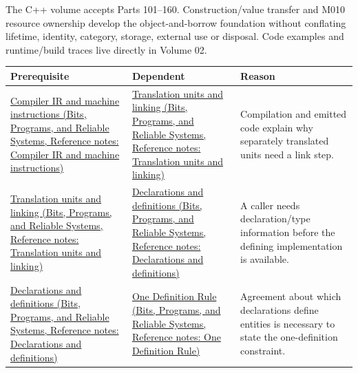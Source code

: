 The C++ volume accepts Parts 101--160. Construction/value transfer and M010 resource ownership develop the object-and-borrow foundation without conflating lifetime, identity, category, storage, external use or disposal. Code examples and runtime/build traces live directly in {Volume 02}.

{\def\LTcaptype{none} %
\begin{longtable}[]{@{}
  >{\raggedright\arraybackslash}p{}
  >{\raggedright\arraybackslash}p{}
  >{\raggedright\arraybackslash}p{}@{}}
\toprule\noalign{}
\begin{minipage}[b]{\linewidth}\raggedright
Prerequisite
\end{minipage} & \begin{minipage}[b]{\linewidth}\raggedright
Dependent
\end{minipage} & \begin{minipage}[b]{\linewidth}\raggedright
Reason
\end{minipage} \\
\midrule\noalign{}
\endhead
\bottomrule\noalign{}
\endlastfoot
\href{../01-Bits-Programs-and-Reliable-Systems/main.pdf\#nameddest=appendix-942ad41afb30}{Compiler IR and machine instructions (Bits, Programs, and Reliable Systems, Reference notes: Compiler IR and machine instructions)} & \href{../01-Bits-Programs-and-Reliable-Systems/main.pdf\#nameddest=appendix-806686359e1b}{Translation units and linking (Bits, Programs, and Reliable Systems, Reference notes: Translation units and linking)} & Compilation and emitted code explain why separately translated units need a link step. \\
\href{../01-Bits-Programs-and-Reliable-Systems/main.pdf\#nameddest=appendix-806686359e1b}{Translation units and linking (Bits, Programs, and Reliable Systems, Reference notes: Translation units and linking)} & \href{../01-Bits-Programs-and-Reliable-Systems/main.pdf\#nameddest=appendix-2e4d494c2d94}{Declarations and definitions (Bits, Programs, and Reliable Systems, Reference notes: Declarations and definitions)} & A caller needs declaration/type information before the defining implementation is available. \\
\href{../01-Bits-Programs-and-Reliable-Systems/main.pdf\#nameddest=appendix-2e4d494c2d94}{Declarations and definitions (Bits, Programs, and Reliable Systems, Reference notes: Declarations and definitions)} & \href{../01-Bits-Programs-and-Reliable-Systems/main.pdf\#nameddest=appendix-49d27bc9d9a5}{One Definition Rule (Bits, Programs, and Reliable Systems, Reference notes: One Definition Rule)} & Agreement about which declarations define entities is necessary to state the one-definition constraint. \\

\end{longtable}}
